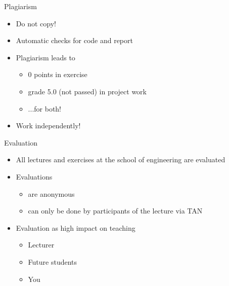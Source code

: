 \begin{frame}[c]{Plagiarism}
	\begin{itemize}
		\setlength\itemsep{0.4cm}
		\item Do not copy!
		\item Automatic checks for code and report
		\item Plagiarism leads to
		\begin{itemize}
			\item 0 points in exercise
			\item grade 5.0 (not passed) in project work
			\item ...for both!
		\end{itemize}
		\item Work independently!
	\end{itemize}
\end{frame}


\begin{frame}{Evaluation}
	\begin{itemize}
		\setlength\itemsep{0.3cm}
		\item All lectures and exercises at the school of engineering are evaluated
		\item Evaluations
		      \begin{itemize}
			      \item are anonymous
			      \item can only be done by participants of the lecture via TAN
		      \end{itemize}
		\item Evaluation as high impact on teaching
		      \begin{itemize}
			      \item Lecturer
			      \item Future students
			      \item You
		      \end{itemize}
	\end{itemize}
\end{frame}

